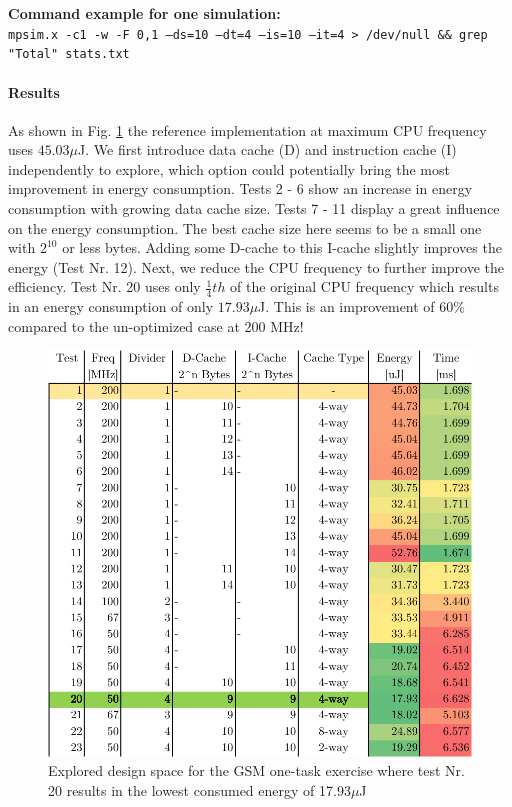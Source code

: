 \documentclass[10pt,bibliography=totocnumbered,listof=totocnumbered, footsepline, headsepline]{scrreprt}
\begin{document}
\textbf{Command example for one simulation:}\\
\texttt{mpsim.x -c1 -w -F 0,1 --ds=10 --dt=4 --is=10 --it=4 > /dev/null \&\& grep "Total" stats.txt}

\paragraph*{Results}
As shown in Fig. \ref{fig:mparm_1_cache} the reference implementation at maximum CPU frequency uses $45.03\mu$J. 
We first introduce data cache (D) and instruction cache (I) independently to explore, which option could potentially bring the most improvement in energy consumption.
Tests 2 - 6 show an increase in energy consumption with growing data cache size.
Tests 7 - 11 display a great influence on the energy consumption.
The best cache size here seems to be a small one with $2^{10}$ or less bytes.
Adding some D-cache to this I-cache slightly improves the energy (Test Nr. 12).
Next, we reduce the CPU frequency to further improve the efficiency.
Test Nr. 20 uses only $\frac{1}{4}{th}$ of the original CPU frequency which results in an energy consumption of only $17.93\mu$J. This is an improvement of 60\% compared to the un-optimized case at 200 MHz!

\begin{figure}[H]
	\centerline{\includegraphics[width=34pc]{mparm_1_cache.pdf}}
	\caption{Explored design space for the GSM one-task exercise where test Nr. 20 results in the lowest consumed energy of 17.93$\mu$J}
	\label{fig:mparm_1_cache}
\end{figure}
\end{document}
